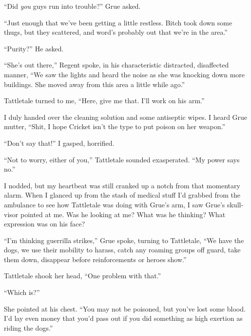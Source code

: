 ``Did \emph{you} guys run into trouble?'' Grue asked.



``Just enough that we've been getting a little restless. Bitch took down some thugs, but they scattered, and word's probably out that we're in the area.''



``Purity?'' He asked.



``She's out there,'' Regent spoke, in his characteristic distracted, disaffected manner, ``We saw the lights and heard the noise as she was knocking down more buildings.  She moved away from this area a little while ago.''



Tattletale turned to me, ``Here, give me that.  I'll work on his arm.''



I duly handed over the cleaning solution and some antiseptic wipes.  I heard Grue mutter, ``Shit, I hope Cricket isn't the type to put poison on her weapon.''



``Don't say that!'' I gasped, horrified.



``Not to worry, either of you,'' Tattletale sounded exasperated.  ``My power says no.''



I nodded, but my heartbeat was still cranked up a notch from that momentary alarm.  When I glanced up from the stash of medical stuff I'd grabbed from the ambulance to see how Tattletale was doing with Grue's arm, I saw Grue's skull-visor pointed at me.  Was he looking at me?  What was he thinking?  What expression was on his face?



``I'm thinking guerrilla strikes,'' Grue spoke, turning to Tattletale, ``We have the dogs, we use their mobility to harass, catch any roaming groups off guard, take them down, disappear before reinforcements or heroes show.''



Tattletale shook her head, ``One problem with that.''



``Which is?''



She pointed at his chest.  ``You may not be poisoned, but you've lost some blood.  I'd lay even money that you'd pass out if you did something as high exertion as riding the dogs.''



